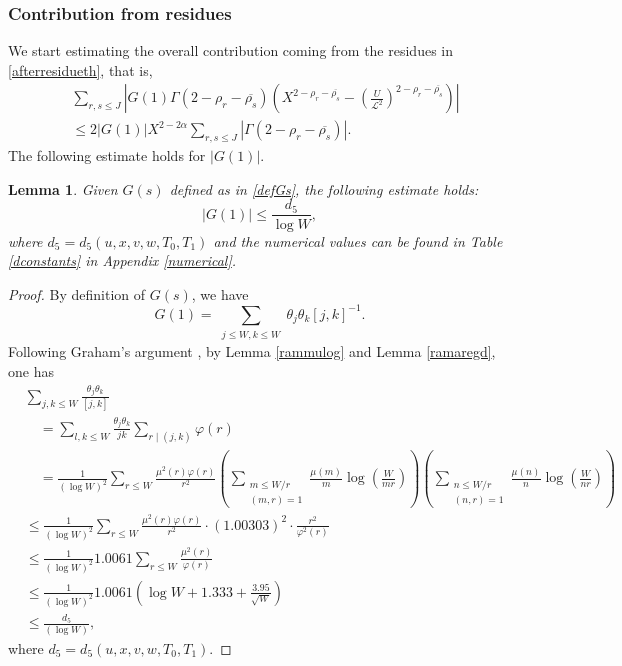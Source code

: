 \documentclass[reqno]{amsart}
\newtheorem{lemma}[theorem]{Lemma}
\numberwithin{equation}{section}
\theoremstyle{remark}
\begin{document}
\subsubsection{Contribution from residues}
We start estimating the overall contribution coming from the residues in \eqref{afterresidueth}, that is,
\begin{equation}\label{contrresidue}
\begin{aligned}
      &\sum_{r,s\le J}\left|G(1)\Gamma(2-\rho_r-\overline{\rho_s})\left(X^{2-\rho_r-\overline{\rho_s}}-\left(\frac{U}{\mathcal{L}^2}\right)^{2-\rho_r-\overline{\rho_s}}\right)\right|\\&\le 2|G(1)|X^{2-2\alpha}\sum_{r,s\le J}\left|\Gamma(2-\rho_r-\overline{\rho_s})\right|.
\end{aligned} 
\end{equation}
The following estimate holds for $|G(1)|$.
\begin{lemma}\label{estg1}
    Given $G(s)$ defined as in \eqref{defGs}, the following estimate holds:
    \[
    |G(1)|\le \frac{d_5}{\log W},
    \]
    where $d_5=d_5(u,x,v,w,T_0,T_1)$ and the numerical values can be found in Table \ref{dconstants} in Appendix \ref{numerical}.
\end{lemma}
\begin{proof}
By definition of $G(s)$, we have
    \[
G(1)=\sum_{\substack{j \leq W, k \leq W}} \theta_j \theta_k[j, k]^{-1}.
\]
Following Graham's argument \cite{GRAHAM197883}, by Lemma \ref{rammulog} and Lemma \ref{ramaregd}, one has
\begin{equation*}
\begin{aligned}
&\sum_{j, k\le W} \frac{\theta_j \theta_k}{[j, k]} \\&
\quad=\sum_{l,k\le W} \frac{\theta_j \theta_k}{jk} \sum_{r \mid(j, k)} \varphi(r) \\&
\quad=\frac{1}{(\log W)^2}\sum_{r \leq  W} \frac{\mu^2(r) \varphi(r)}{r^2}\left(\sum_{\substack{m \leq  W / r \\
(m, r)=1}} \frac{\mu(m)}{m} \log \left(\frac{W}{m r}\right)\right)\left(\sum_{\substack{n \leq  W / r \\
(n, r)=1}} \frac{\mu(n)}{n} \log \left(\frac{W}{n r}\right)\right)\\&\le \frac{1}{(\log W)^2}\sum_{r \leq  W} \frac{\mu^2(r) \varphi(r)}{r^2} \cdot (1.00303)^2\cdot \frac{r^2}{\varphi^2(r)}\\&\le \frac{1}{(\log W)^2}1.0061 \sum_{r \leq  W} \frac{\mu^2(r)}{ \varphi(r)}\\&\le \frac{1}{(\log W)^2}1.0061\left(\log W+ 1.333+\frac{3.95}{\sqrt{W}}\right)\\&\le \frac{d_5}{(\log W)},
\end{aligned}
\end{equation*}
where $d_5=d_5(u,x,v,w,T_0,T_1)$.
\end{proof}
\end{document}
